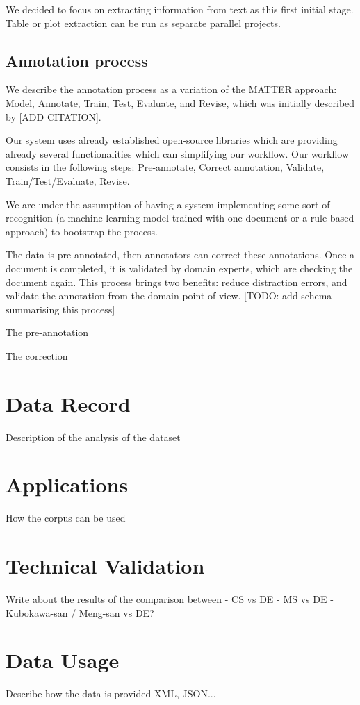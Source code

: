 \documentclass[a4paper,10pt]{article}
\begin{document}
We decided to focus on extracting information from text as this first initial stage. Table or plot extraction can be run as separate parallel projects.  

\subsection{Annotation process}
\label{sec:annotation-process}
We describe the annotation process as a variation of the MATTER approach: Model, Annotate, Train, Test, Evaluate, and Revise, which was initially described by [ADD CITATION]. 

Our system uses already established open-source libraries which are providing already several functionalities which can simplifying our workflow. Our workflow consists in the following steps: Pre-annotate, Correct annotation, Validate, Train/Test/Evaluate, Revise. 

We are under the assumption of having a system implementing some sort of recognition (a machine learning model trained with one document or a rule-based approach) to bootstrap the process. 

The data is pre-annotated, then annotators can correct these annotations. Once a document is completed, it is validated by domain experts, which are checking the document again. This process brings two benefits: reduce distraction errors, and validate the annotation from the domain point of view. 
[TODO: add schema summarising this process]

The pre-annotation 

The correction


\section{Data Record}
Description of the analysis of the dataset 

\section{Applications}
How the corpus can be used

\section{Technical Validation} 
Write about the results of the comparison between 
- CS vs DE 
- MS vs DE
- Kubokawa-san / Meng-san vs DE? 

\section{Data Usage} 
Describe how the data is provided XML, JSON... 
\end{document}

